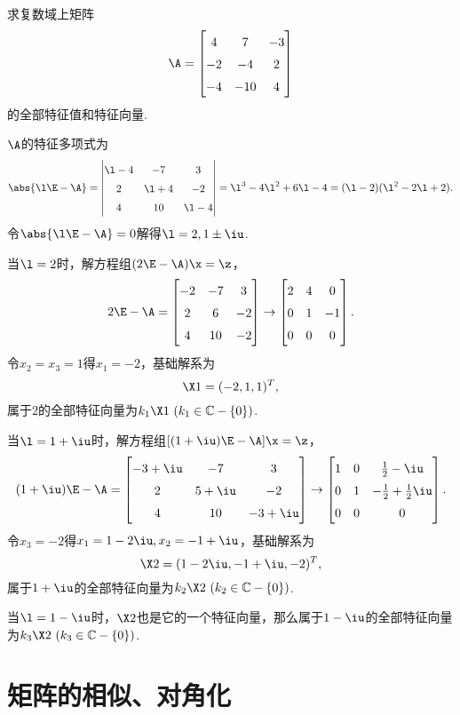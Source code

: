 \begin{example}
求复数域上矩阵\[
\A = \begin{bmatrix}
4 & 7 & -3 \\
-2 & -4 & 2 \\
-4 & -10 & 4
\end{bmatrix}
\]的全部特征值和特征向量.
\begin{solution}
\(\A\)的特征多项式为\[
\abs{\l\E-\A} = \begin{vmatrix}
\l-4 & -7 & 3 \\
2 & \l+4 & -2 \\
4 & 10 & \l-4
\end{vmatrix}
= \l^3 - 4\l^2 + 6\l - 4
= (\l-2)(\l^2-2\l+2).
\]令\(\abs{\l\E-\A}=0\)解得\(\l=2,1\pm\iu\).

当\(\l=2\)时，解方程组\((2\E-\A)\x=\z\)，\[
2\E-\A = \begin{bmatrix}
-2 & -7 & 3 \\
2 & 6 & -2 \\
4 & 10 & -2
\end{bmatrix} \to \begin{bmatrix}
2 & 4 & 0 \\
0 & 1 & -1 \\
0 & 0 & 0
\end{bmatrix}.
\]令\(x_2=x_3=1\)得\(x_1=-2\)，基础解系为\[
\X1 = (-2,1,1)^T,
\]属于\(2\)的全部特征向量为\(k_1\X1\ (k_1\in\mathbb{C}-\{0\})\).

当\(\l=1+\iu\)时，解方程组\([(1+\iu)\E-\A]\x=\z\)，\[
(1+\iu)\E-\A = \begin{bmatrix}
-3+\iu & -7 & 3 \\
2 & 5+\iu & -2 \\
4 & 10 & -3+\iu
\end{bmatrix} \to \def\arraystretch{1.5}\begin{bmatrix}
1 & 0 & \frac{1}{2}-\iu \\
0 & 1 & -\frac{1}{2}+\frac{1}{2}\iu \\
0 & 0 & 0
\end{bmatrix}.
\]令\(x_3=-2\)得\(x_1=1-2\iu,x_2=-1+\iu\)，基础解系为\[
\X2 = (1-2\iu,-1+\iu,-2)^T,
\]属于\(1+\iu\)的全部特征向量为\(k_2\X2\ (k_2\in\mathbb{C}-\{0\})\).

当\(\l=1-\iu\)时，\(\X2\)也是它的一个特征向量，那么属于\(1-\iu\)的全部特征向量为\(k_3\X2\ (k_3\in\mathbb{C}-\{0\})\).
\end{solution}
\end{example}

\section{矩阵的相似、对角化}
